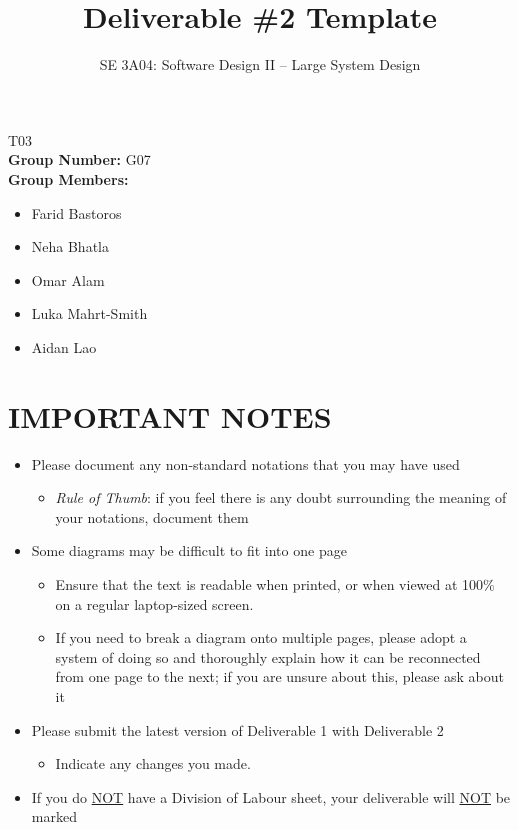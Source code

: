 \documentclass[]{article}
\title{Deliverable \#2 Template}
\author{SE 3A04: Software Design II -- Large System Design}
\date{}
\begin{document}
\setlength{\parindent}{0pt}

\maketitle	
{} T03\\
{\bf Group Number:} G07 \\
{\bf Group Members:} 
\begin{itemize}
	\item Farid Bastoros 
	\item Neha Bhatla
	\item Omar Alam
	\item Luka Mahrt-Smith
	\item Aidan Lao
\end{itemize}

\section*{IMPORTANT NOTES}
\begin{itemize}
	\item Please document any non-standard notations that you may have used
	\begin{itemize}
		\item \emph{Rule of Thumb}: if you feel there is any doubt surrounding the meaning of your notations, document them
	\end{itemize}
	\item Some diagrams may be difficult to fit into one page
	\begin{itemize}
		\item Ensure that the text is readable when printed, or when viewed at 100\% on a regular laptop-sized screen.
		\item If you need to break a diagram onto multiple pages, please adopt a system of doing so and thoroughly explain how it can be reconnected from one page to the next; if you are unsure about this, please ask about it
	\end{itemize}
	\item Please submit the latest version of Deliverable 1 with Deliverable 2
	\begin{itemize}
		\item Indicate any changes you made.
	\end{itemize}
	\item If you do \underline{NOT} have a Division of Labour sheet, your deliverable will \underline{NOT} be marked
\end{itemize}
\end{document}
